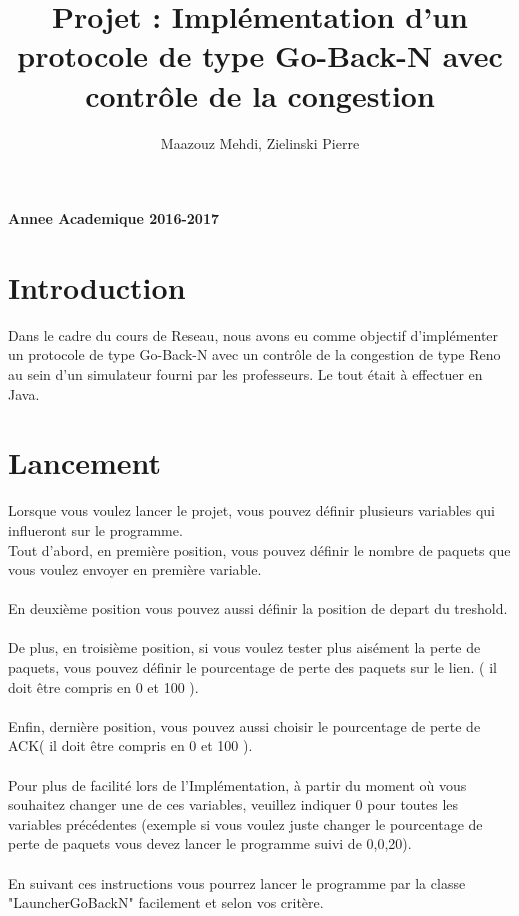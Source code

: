 \documentclass[a4paper,10pt]{article}
\title{Projet : Implémentation d'un protocole de type Go-Back-N avec contrôle de la congestion}
\author{Maazouz Mehdi, Zielinski Pierre}
\begin{document}
\maketitle
\textbf{Annee Academique 2016-2017}\\
\tableofcontents
\newpage

\section{Introduction}
Dans le cadre du cours de Reseau, nous avons eu comme objectif d'implémenter un protocole de type Go-Back-N
avec un contrôle de la congestion de type Reno au sein d'un simulateur fourni par les professeurs. Le tout était 
à effectuer en Java.

\section{Lancement}
Lorsque vous voulez lancer le projet, vous pouvez définir plusieurs variables qui influeront sur le programme.\\
Tout d'abord, en première position, vous pouvez définir le nombre de paquets que vous voulez envoyer en première variable.\\
\\
En deuxième position vous pouvez aussi définir la position de depart du treshold.\\
\\
De plus, en troisième position, si vous voulez tester plus aisément la perte de paquets, vous pouvez définir le pourcentage de perte des paquets sur le lien.
( il doit être compris en 0 et 100 ).\\
\\
Enfin, dernière position, vous pouvez aussi choisir le pourcentage de perte de ACK( il doit être compris en 0 et 100 ).\\
\\
Pour plus de facilité lors de l'Implémentation, à partir du moment où vous souhaitez changer une de ces variables, veuillez indiquer 0 pour toutes les variables précédentes (exemple si vous voulez juste changer le pourcentage de perte de paquets vous devez lancer le programme suivi de 0,0,20).\\
\\
En suivant ces instructions vous pourrez lancer le programme par la classe "LauncherGoBackN" facilement et selon vos critère.
\end{document}
